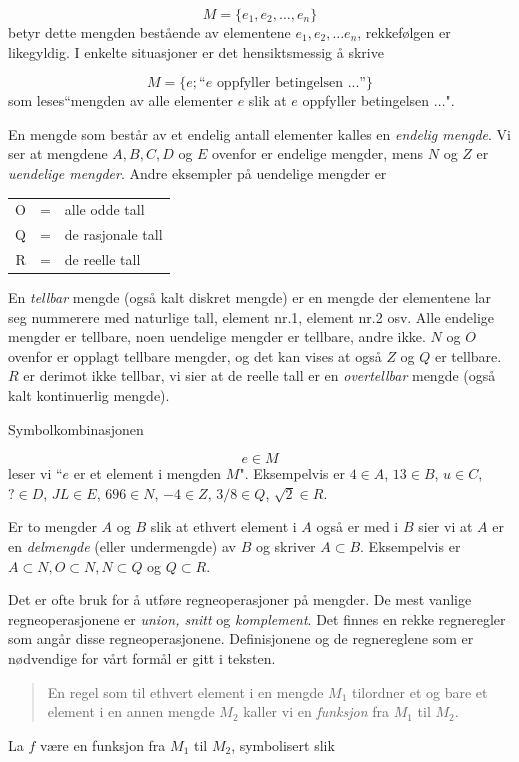 \[     M = \{e_1, e_2, \ldots, e_n\}         \]
betyr dette mengden bestående av elementene $e_1,e_2, \ldots e_n$,
rekkefølgen er likegyldig.  I enkelte situasjoner er det 
hensiktsmessig å skrive

\[         M = \{e; \mbox{``$e$ oppfyller betingelsen ...''} \} \]%
som leses``mengden av alle elementer $e$ slik at $e$ oppfyller 
betingelsen $\ldots$".

En mengde som består av et endelig antall elementer kalles en
{\em endelig mengde}.  Vi ser at mengdene $A, B, C, D$ og $E$ ovenfor
er endelige mengder, mens $N$ og $Z$ er {\em uendelige mengder}.  Andre
eksempler på uendelige mengder er
\begin{center}
\begin{tabular}{rcl}
      O &=& alle odde tall \\
      Q &=& de rasjonale tall \\
      R &=& de reelle tall
\end{tabular}
\end{center}
En {\em tellbar} mengde (også kalt diskret mengde) er en mengde der
elementene lar seg nummerere med naturlige tall, element nr.1, element 
nr.2 osv.  Alle endelige mengder er tellbare, noen uendelige mengder
er tellbare, andre ikke.  $N$ og $O$ ovenfor er opplagt tellbare mengder,
og det kan vises at også $Z$ og $Q$ er tellbare.  $R$ er derimot
ikke tellbar, vi sier at de reelle tall er en {\em overtellbar} mengde
(også kalt kontinuerlig mengde).

Symbolkombinasjonen

\[           e\in M         \]
leser vi ``$e$ er et element i mengden $M$".  Eksempelvis er 
$4\in A$, $13\in B$, $u\in C$, $?\in D$, $JL\in E$, $696\in N$, $-4\in Z$,
$3/8\in Q$, $\sqrt{2}\in R$.

Er to mengder $A$ og $B$ slik at ethvert element i $A$ også er med
i $B$ sier vi at $A$ er en {\em delmengde} (eller undermengde) av $B$
og skriver $A\subset B$.  Eksempelvis er $A\subset N, O\subset N,
N\subset Q$ og $Q\subset R$.

Det er ofte bruk for å utføre regneoperasjoner på mengder.
De mest vanlige regneoperasjonene er {\em union, snitt} og 
{\em komplement}.  Det finnes en rekke regneregler som angår disse
regneoperasjonene.  Definisjonene og de regnereglene som er 
nødvendige for vårt formål er gitt i teksten.

\begin{quote}
En regel som til ethvert element i en mengde $M_1$ tilordner et og bare et 
element i en annen mengde $M_2$ kaller vi en {\em funksjon} fra 
$M_1$ til $M_2$.
\end{quote}
La $f$ være en funksjon fra $M_1$ til $M_2$, symbolisert slik
         
